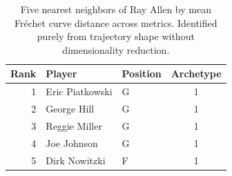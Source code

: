\begin{table}[htbp]
  \centering\small
  \begin{tabular}{rllc}
    \toprule
    Rank & Player & Position & Archetype \\
    \midrule
    1 & Eric Piatkowski & G & 1 \\
    2 & George Hill & G & 1 \\
    3 & Reggie Miller & G & 1 \\
    4 & Joe Johnson & G & 1 \\
    5 & Dirk Nowitzki & F & 1 \\
    \bottomrule
  \end{tabular}
  \caption{Five nearest neighbors of Ray Allen by mean Fr\'{e}chet curve distance across metrics. Identified purely from trajectory shape without dimensionality reduction.}
  \label{tab:Ray_Allen_frechet_curve_neighbors}
\end{table}

